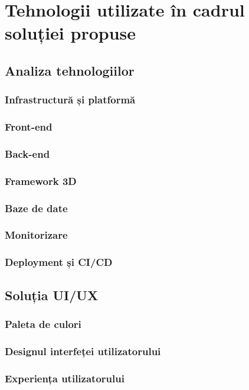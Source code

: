 \chapter{Tehnologii utilizate în cadrul soluției propuse}
\label{chapter:tehnologii}

\section{Analiza tehnologiilor}
\label{sec:proj}
\subsection{Infrastructură și platformă}
\subsection{Front-end}
\subsection{Back-end}
\subsection{Framework 3D}
\subsection{Baze de date}
\subsection{Monitorizare}
\subsection{Deployment și CI/CD}

\section{Soluția UI/UX}
\label{sub-sec:proj-ui-ux}
\subsection{Paleta de culori}
\subsection{Designul interfeței utilizatorului}
\subsection{Experiența utilizatorului}
